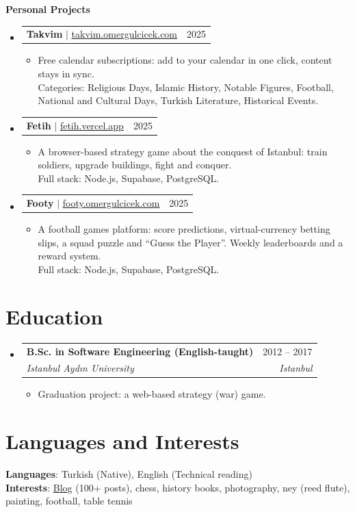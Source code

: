 \documentclass[a4paper,11pt]{article}
\makeatletter
\newcommand{\resumeItem}[1]{
  \item\small{
    {#1 \vspace{-2pt}}
  }
}
\newcommand{\resumeSubheading}[4]{
  \vspace{-2pt}\item
    \begin{tabular*}{0.97\textwidth}[t]{l@{\extracolsep{\fill}}r}
      \textbf{#1} & \small #2 \\
      \textit{\small#3} & \textit{\small #4} \\
    \end{tabular*}\vspace{-7pt}
}
\newcommand{\resumeProjectHeading}[2]{
    \item
    \begin{tabular*}{0.97\textwidth}{l@{\extracolsep{\fill}}r}
      \small#1 & \small #2 \\
    \end{tabular*}\vspace{-7pt}
}
\newcommand{\resumeSubHeadingListStart}{\begin{itemize}[leftmargin=0.15in, label={}]}
\newcommand{\resumeSubHeadingListEnd}{\end{itemize}}
\newcommand{\resumeItemListStart}{\begin{itemize}}
\newcommand{\resumeItemListEnd}{\end{itemize}\vspace{3pt}}
\makeatother
\begin{document}
  \vspace{4pt}
  {\small \textbf{Personal Projects}\par}
    \resumeSubHeadingListStart
      \resumeProjectHeading
          {\textbf{Takvim} $|$ \href{https://takvim.omergulcicek.com}{\underline{takvim.omergulcicek.com}}}{2025}
          \resumeItemListStart
            \resumeItem{Free calendar subscriptions: add to your calendar in one click, content stays in sync. \\ Categories: Religious Days, Islamic History, Notable Figures, Football, National and Cultural Days, Turkish Literature, Historical Events.}
          \resumeItemListEnd

      \resumeProjectHeading
          {\textbf{Fetih} $|$ \href{https://fetih.vercel.app}{\underline{fetih.vercel.app}}}{2025}
          \resumeItemListStart
            \resumeItem{A browser-based strategy game about the conquest of Istanbul: train soldiers, upgrade buildings, fight and conquer. \\ Full stack: Node.js, Supabase, PostgreSQL.}
          \resumeItemListEnd

      \resumeProjectHeading
          {\textbf{Footy} $|$ \href{https://footy.omergulcicek.com}{\underline{footy.omergulcicek.com}}}{2025}
          \resumeItemListStart
            \resumeItem{A football games platform: score predictions, virtual-currency betting slips, a squad puzzle and ``Guess the Player''. Weekly leaderboards and a reward system. \\ Full stack: Node.js, Supabase, PostgreSQL.}
          \resumeItemListEnd
    \resumeSubHeadingListEnd

\section{Education}
  \resumeSubHeadingListStart
    \resumeSubheading
      {B.Sc. in Software Engineering (English-taught)}{2012 -- 2017}
      {Istanbul Aydın University}{Istanbul}
      \resumeItemListStart
        \resumeItem{Graduation project: a web-based strategy (war) game.}
      \resumeItemListEnd
  \resumeSubHeadingListEnd

\section{Languages and Interests}
  {\small
    \textbf{Languages}: Turkish (Native), English (Technical reading) \\
    \textbf{Interests}: \href{https://omergulcicek.com/blog}{\underline{Blog}} (100+ posts), chess, history books, photography, ney (reed flute), painting, football, table tennis\par
  }
\end{document}
